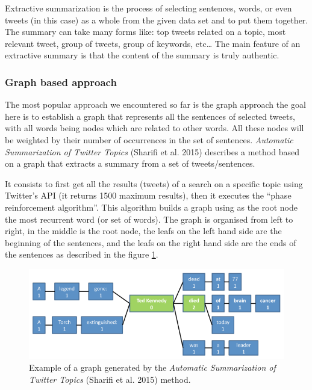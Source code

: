 \documentclass{llncs}
\begin{document}
Extractive summarization is the process of selecting sentences, words, or even
tweets (in this case) as a whole from the given data set and to put them
together. The summary can take many forms like: top tweets related on a topic,
most relevant tweet, group of tweets, group of keywords, etc… The main
feature of an extractive summary is that the content of the summary is truly
authentic.

\subsubsection{Graph based approach}

The most popular approach we encountered so far is the graph approach the goal
here is to establish a graph that represents all the sentences of selected
tweets, with all words being nodes which are related to other words.
All these nodes will be weighted by their number of occurrences in the set of
sentences. \textit{Automatic Summarization of Twitter Topics} (Sharifi et al.
2015) \cite{sharifi_automatic_nodate} describes a method based on a graph that
extracts a summary from a set of tweets/sentences.

It consists to first get all the results (tweets) of a search on a specific
topic using Twitter’s API (it returns 1500 maximum results), then it executes
the ``phase reinforcement algorithm''. This algorithm builds a graph using as
the root node the most recurrent word (or set of words). The graph is organised
from left to right, in the middle is the root node, the leafs on the left hand
side are the beginning of the sentences, and the leafs on the right hand side
are the ends of the sentences as described in the figure \ref{fig:fig1}.

\begin{figure}[H]
    \includegraphics[width=\textwidth]{fig1.png}
    \caption{Example of a graph generated by the \textit{Automatic Summarization
    of Twitter Topics} (Sharifi et al. 2015) \cite{sharifi_automatic_nodate}
    method.}
    \label{fig:fig1}
\end{figure}
\end{document}
